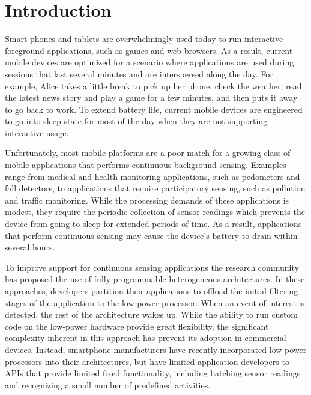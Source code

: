 
\section{\label{sec:Introduction}Introduction}

Smart phones and tablets are overwhelmingly used today to run
interactive foreground applications, such as games and web browsers.
As a result, current mobile devices are optimized for a scenario where
applications are used during sessions that last several minutes and
are interspersed along the day.  For example, Alice takes a little
break to pick up her phone, check the weather, read the latest news
story and play a game for a few minutes, and then puts it away to
go back to work.  To extend battery life, current mobile devices are
engineered to go into sleep state for most of the day when they are
not supporting interactive usage.

Unfortunately, most mobile platforms are a poor match for a growing
class of mobile applications that performs continuous background
sensing.  Examples range from medical and health monitoring
applications, such as pedometers and fall detectors, to applications
that require participatory sensing, such as pollution and traffic
monitoring.  While the processing demands of these applications is
modest, they require the periodic collection of sensor readings which
prevents the device from going to sleep for extended periods of time.
As a result, applications that perform continuous sensing may cause
the device's battery to drain within several hours.

To improve support for continuous sensing applications the research
community has proposed the use of fully programmable heterogeneous
architectures.  In these approaches, developers partition their
applications to offload the initial filtering stages of the
application to the low-power processor.  When an event of interest is
detected, the rest of the architecture wakes up.  While the ability to
run custom code on the low-power hardware provide great flexibility,
the significant complexity inherent in this approach has prevent its
adoption in commercial devices.  Instead, smartphone manufacturers
have recently incorporated low-power processors into their
architectures, but have limited application developers to APIs that
provide limited fixed functionality, including batching sensor
readings and recognizing a small number of predefined activities.

